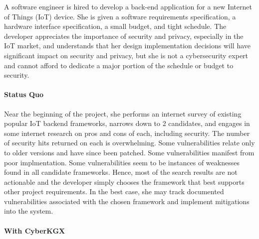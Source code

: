 A software engineer is hired to develop a back-end application for a new Internet of Things (IoT) device.  She is given a software requirements specification, a hardware interface specification, a small budget, and tight schedule.  The developer appreciates the importance of security and privacy, especially in the IoT market, and understands that her design implementation decisions will have significant impact on security and privacy, but she is not a cybersecurity expert and cannot afford to dedicate a major portion of the schedule or budget to security.

\paragraph{Status Quo} Near the beginning of the project, she performs an internet survey of existing popular IoT backend frameworks, narrows down to 2 candidates, and engages in some internet research on pros and cons of each, including security.  The number of security hits returned on each is overwhelming.  Some vulnerabilities relate only to older versions and have since been patched.  Some vulnerabilities manifest from poor implmentation.  Some vulnerabilities seem to be instances of weaknesses found in all candidate frameworks.  Hence, most of the search results are not actionable and the developer simply chooses the framework that best supports other project requirements.  In the best case, she may track documented vulnerabilities associated with the chosen framework and implement mitigations into the system.

\paragraph{With CyberKGX}